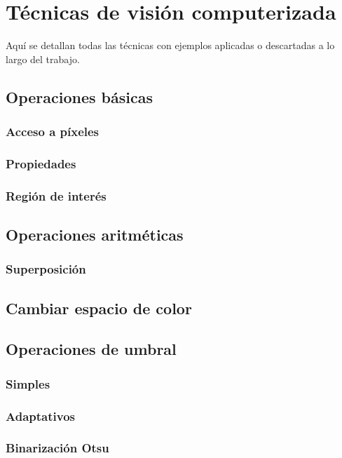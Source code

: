 \chapter{Técnicas de visión computerizada}
Aquí se detallan todas las técnicas con ejemplos aplicadas o
descartadas a lo largo del trabajo.
\section{Operaciones básicas}
\subsection{Acceso a píxeles}

\subsection{Propiedades}

\subsection{Región de interés}

\section{Operaciones aritméticas}
\subsection{Superposición}

\section{Cambiar espacio de color}

\section{Operaciones de umbral}
\subsection{Simples}
\subsection{Adaptativos}
\subsection{Binarización Otsu}

